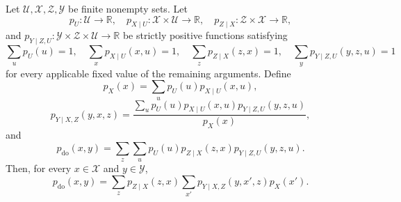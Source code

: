 \begin{theorem}
Let $\mathcal U,\mathcal X,\mathcal Z,\mathcal Y$ be finite nonempty
sets.  Let
\[
 p_U:\mathcal U\to\mathbb R,\quad
 p_{X\mid U}:\mathcal X\times\mathcal U\to\mathbb R,\quad
 p_{Z\mid X}:\mathcal Z\times\mathcal X\to\mathbb R,
\]
and
$p_{Y\mid Z,U}:\mathcal Y\times\mathcal Z\times\mathcal U\to\mathbb R$
be strictly positive functions satisfying
\[
 \sum_u p_U(u)=1,\quad
 \sum_x p_{X\mid U}(x,u)=1,\quad
 \sum_z p_{Z\mid X}(z,x)=1,\quad
 \sum_y p_{Y\mid Z,U}(y,z,u)=1
\]
for every applicable fixed value of the remaining arguments.  Define
\[
 p_X(x)=\sum_u p_U(u)p_{X\mid U}(x,u),
\]
\[
 p_{Y\mid X,Z}(y,x,z)=
 \frac{\sum_u p_U(u)p_{X\mid U}(x,u)p_{Y\mid Z,U}(y,z,u)}
 {p_X(x)},
\]
and
\[
 p_{\mathrm{do}}(x,y)=
 \sum_z\sum_u p_U(u)p_{Z\mid X}(z,x)p_{Y\mid Z,U}(y,z,u).
\]
Then, for every $x\in\mathcal X$ and $y\in\mathcal Y$,
\[
 p_{\mathrm{do}}(x,y)=
 \sum_z p_{Z\mid X}(z,x)
 \sum_{x'}p_{Y\mid X,Z}(y,x',z)p_X(x').
\]
\end{theorem}
